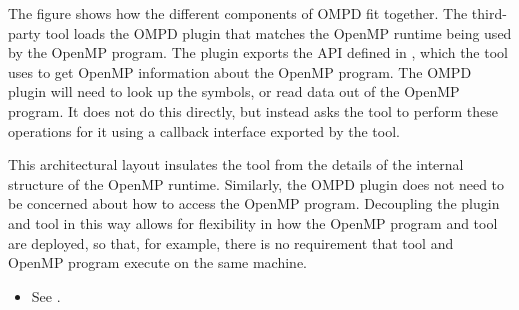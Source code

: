 The figure shows how the different components of OMPD fit together. The third-party tool loads 
the OMPD plugin
that matches the OpenMP runtime being used by the OpenMP program. The 
plugin exports the API defined in
, which the tool uses to get 
OpenMP information about the 
OpenMP program. The OMPD
plugin will need to look up the symbols, or read data out of the 
OpenMP program. It does not do this directly,
but instead asks the tool to perform these operations 
for it using a callback interface exported
by the tool.

This architectural layout insulates the tool from the details of the 
internal structure of the
OpenMP runtime. Similarly, the OMPD plugin does not need to be 
concerned about how to access
the OpenMP program. Decoupling the plugin and tool in this 
way allows for flexibility in how the OpenMP program and tool are deployed, so that, for example, 
there is no requirement that tool and OpenMP program
execute on the same machine.

\crossreferences
\begin{itemize}
\item See .
\end{itemize}

